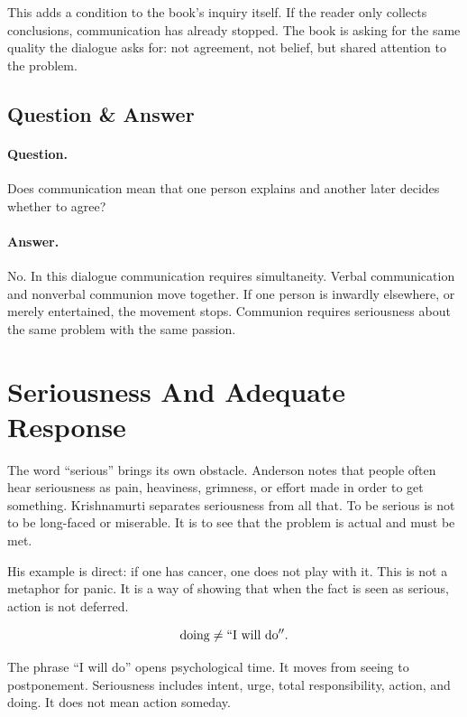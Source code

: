 \documentclass[11pt,oneside]{book}
\begin{document}
This adds a condition to the book's inquiry itself. If the reader only collects conclusions, communication has already stopped. The book is asking for the same quality the dialogue asks for: not agreement, not belief, but shared attention to the problem.

\subsection{Question \& Answer}

\paragraph{Question.}
Does communication mean that one person explains and another later decides whether to agree?

\paragraph{Answer.}
No. In this dialogue communication requires simultaneity. Verbal communication and nonverbal communion move together. If one person is inwardly elsewhere, or merely entertained, the movement stops. Communion requires seriousness about the same problem with the same passion.

\section{Seriousness And Adequate Response}

The word ``serious'' brings its own obstacle. Anderson notes that people often hear seriousness as pain, heaviness, grimness, or effort made in order to get something. Krishnamurti separates seriousness from all that. To be serious is not to be long-faced or miserable. It is to see that the problem is actual and must be met.

His example is direct: if one has cancer, one does not play with it. This is not a metaphor for panic. It is a way of showing that when the fact is seen as serious, action is not deferred.

\begin{equation}
\mathrm{doing} \neq \mathrm{``I\ will\ do''}.
\end{equation}

The phrase ``I will do'' opens psychological time. It moves from seeing to postponement. Seriousness includes intent, urge, total responsibility, action, and doing. It does not mean action someday.
\end{document}
